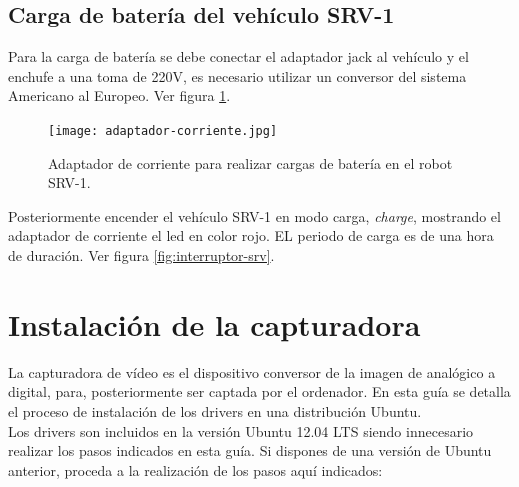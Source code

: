 \subsection{Carga de batería del vehículo SRV-1}

Para la carga de batería se debe conectar el adaptador jack al vehículo y el enchufe a una toma de 220V, es necesario utilizar un conversor del sistema Americano al Europeo. Ver figura \ref{fig:adaptador-corriente}.\\

\begin{figure}[H]
  \begin{center}
    \texttt{[image: adaptador-corriente.jpg]}
  \end{center}
  \caption{Adaptador de corriente para realizar cargas de batería en el robot SRV-1.}
  \label{fig:adaptador-corriente}
\end{figure}

Posteriormente encender el vehículo SRV-1 en modo carga, \emph{charge}, mostrando el adaptador de corriente el led en color rojo. EL periodo de carga es de una hora de duración. Ver figura \ref{fig:interruptor-srv}.\\

\section{Instalación de la capturadora}
\label{sec:drivers-capturadora}

La capturadora de vídeo es el dispositivo conversor de la imagen de analógico a digital, para, posteriormente ser captada por el ordenador. En esta guía se detalla el proceso de instalación de los drivers en una distribución Ubuntu.\\

Los drivers son incluidos en la versión Ubuntu 12.04 LTS siendo innecesario realizar los pasos indicados en esta guía. Si dispones de una versión de Ubuntu anterior, proceda a la realización de los pasos aquí indicados:

